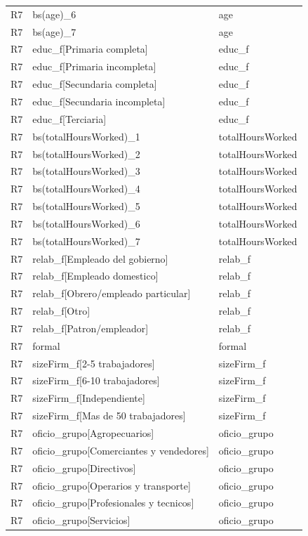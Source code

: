 \begin{longtable}{lll}
R7 & bs(age)\_6 & age \\
R7 & bs(age)\_7 & age \\
R7 & educ\_f[Primaria completa] & educ\_f \\
R7 & educ\_f[Primaria incompleta] & educ\_f \\
R7 & educ\_f[Secundaria completa] & educ\_f \\
R7 & educ\_f[Secundaria incompleta] & educ\_f \\
R7 & educ\_f[Terciaria] & educ\_f \\
R7 & bs(totalHoursWorked)\_1 & totalHoursWorked \\
R7 & bs(totalHoursWorked)\_2 & totalHoursWorked \\
R7 & bs(totalHoursWorked)\_3 & totalHoursWorked \\
R7 & bs(totalHoursWorked)\_4 & totalHoursWorked \\
R7 & bs(totalHoursWorked)\_5 & totalHoursWorked \\
R7 & bs(totalHoursWorked)\_6 & totalHoursWorked \\
R7 & bs(totalHoursWorked)\_7 & totalHoursWorked \\
R7 & relab\_f[Empleado del gobierno] & relab\_f \\
R7 & relab\_f[Empleado domestico] & relab\_f \\
R7 & relab\_f[Obrero/empleado particular] & relab\_f \\
R7 & relab\_f[Otro] & relab\_f \\
R7 & relab\_f[Patron/empleador] & relab\_f \\
R7 & formal & formal \\
R7 & sizeFirm\_f[2-5 trabajadores] & sizeFirm\_f \\
R7 & sizeFirm\_f[6-10 trabajadores] & sizeFirm\_f \\
R7 & sizeFirm\_f[Independiente] & sizeFirm\_f \\
R7 & sizeFirm\_f[Mas de 50 trabajadores] & sizeFirm\_f \\
R7 & oficio\_grupo[Agropecuarios] & oficio\_grupo \\
R7 & oficio\_grupo[Comerciantes y vendedores] & oficio\_grupo \\
R7 & oficio\_grupo[Directivos] & oficio\_grupo \\
R7 & oficio\_grupo[Operarios y transporte] & oficio\_grupo \\
R7 & oficio\_grupo[Profesionales y tecnicos] & oficio\_grupo \\
R7 & oficio\_grupo[Servicios] & oficio\_grupo \\

\end{longtable}
